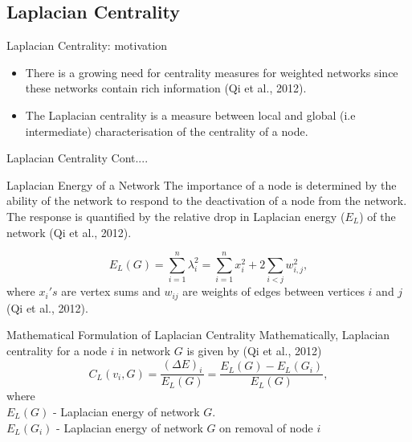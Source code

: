 \documentclass{beamer}
\begin{document}
\subsection{Laplacian Centrality}
\begin{frame}{Laplacian Centrality: motivation}
	\begin{itemize}
		\item There is a growing need for centrality measures for weighted networks since these networks contain rich information (Qi et al., 2012).
		\vspace{0.2cm}
		\pause
		\item The Laplacian centrality is a measure between local and global (i.e intermediate) characterisation of the centrality of a node.
	    \end{itemize}
\end{frame}

\begin{frame}{Laplacian Centrality Cont....}
	\begin{block}{Laplacian Energy of a Network}
		The importance of a node is determined by the ability of the network to respond to the deactivation of a node from the network. \\
		\vspace{0.4cm}
		The response is quantified by the relative drop in Laplacian energy ($E_{L}$) of the network (Qi et al., 2012).
        \vspace{0.4cm}
		
		\begin{equation}
		E_L(G) = \sum_{i=1}^n \lambda_i ^2 = \sum_{i=1}^n x_i^2 + 2 \sum_{i<j} w_{i,j}^2,
		\end{equation}
		 where $x_i's$ are vertex sums and $w_{ij}$ are weights of edges between vertices $i$ and $j$ (Qi et al., 2012).
	\end{block}
\end{frame}

\begin{frame}{Mathematical Formulation of Laplacian Centrality}
Mathematically, Laplacian centrality for a node $i$ in network $G$ is given by (Qi et al., 2012) \\
\vspace{0.2cm}
\begin{equation}
C_L(v_i,G) = \frac{(\Delta E)_i}{E_L(G)} = \frac{E_L(G) - E_L(G_i)}{E_L(G)},
\label{lapcent}
\end{equation}
where \\
$E_L(G)$ - Laplacian energy of network $G$.\\
$E_L(G_i)$ - Laplacian energy of network $G$ on removal of node $i$
\end{frame}
\end{document}
